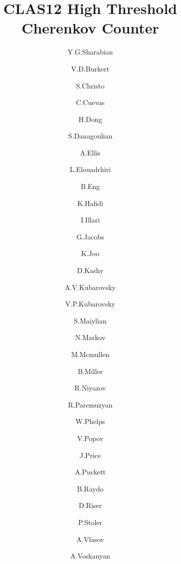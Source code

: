 \title{CLAS12 High Threshold Cherenkov Counter}

\author[1]{Y.G.Sharabian}
\author[1]{V.D.Burkert}
\author[1]{S.Christo}
\author[1]{C.Cuevas}
\author[1]{H.Dong}
\author[2]{S.Danagoulian}
\author[1]{A.Ellis}
\author[1]{L.Elouadrhiri}
\author[1]{B.Eng}
\author[3]{K.Hafidi}
\author[4]{I.Illari}
\author[1]{G.Jacobs}
\author[5]{K.Joo}
\author[1]{D.Kashy}
\author[5]{A.V.Kubarovsky}
\author[1]{V.P.Kubarovsky}
\author[6]{S.Maiylian}
\author[1]{N.Markov}
\author[1]{M.Mcmullen}
\author[1]{B.Miller}
\author[7]{R.Niyazov}
\author[8]{R.Paremuzyan}
\author[9]{W.Phelps}
\author[1]{V.Popov}
\author[10]{J.Price}
\author[5]{A.Puckett}
\author[1]{B.Raydo}
\author[5]{D.Riser}
\author[7]{P.Stoler}
\author[11]{A.Vlasov}
\author[6]{A.Voskanyan}

\address[1]{Thomas Jefferson National Accelerator Facility}
\address[2]{North Carolina Agricultural and Technical State University}
\address[3]{Argonne National Laboratory}
\address[4]{George Washington Univercity}
\address[5]{University of Connecticut}
\address[6]{Yerevan Physics Institute}
\address[7]{Rensselaer Polytechnic Institute}
\address[8]{University of New Hampshire}
\address[9]{Christopher Newport University}
\address[10]{California State University, Dominguez Hills}
\address[11]{National Research Centre Kurchatov Institute - ITEP}
